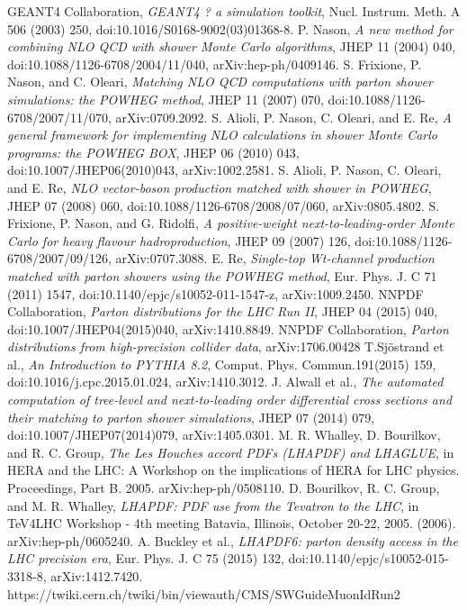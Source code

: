 \begin{thebibliography}{999}
		
		 GEANT4 Collaboration, \emph{GEANT4 ? a simulation toolkit}, Nucl. Instrum. Meth. A 506 (2003) 250, doi:10.1016/S0168-9002(03)01368-8.
		 P. Nason, \emph{A new method for combining NLO QCD with shower Monte Carlo algorithms}, JHEP 11 (2004) 040, doi:10.1088/1126-6708/2004/11/040, arXiv:hep-ph/0409146.
		 S. Frixione, P. Nason, and C. Oleari, \emph{Matching NLO QCD computations with parton shower simulations: the POWHEG method}, JHEP 11 (2007) 070, doi:10.1088/1126-6708/2007/11/070, arXiv:0709.2092.
		 S. Alioli, P. Nason, C. Oleari, and E. Re, \emph{A general framework for implementing NLO calculations in shower Monte Carlo programs: the POWHEG BOX}, JHEP 06 (2010) 043, doi:10.1007/JHEP06(2010)043, arXiv:1002.2581.
		 S. Alioli, P. Nason, C. Oleari, and E. Re, \emph{NLO vector-boson production matched with shower in POWHEG}, JHEP 07 (2008) 060, doi:10.1088/1126-6708/2008/07/060, arXiv:0805.4802.
		 S. Frixione, P. Nason, and G. Ridolfi, \emph{A positive-weight next-to-leading-order Monte Carlo for heavy flavour hadroproduction}, JHEP 09 (2007) 126, doi:10.1088/1126-6708/2007/09/126, arXiv:0707.3088.
		 E. Re, \emph{Single-top Wt-channel production matched with parton showers using the POWHEG method}, Eur. Phys. J. C 71 (2011) 1547, doi:10.1140/epjc/s10052-011-1547-z, arXiv:1009.2450.
		 NNPDF Collaboration, \emph{Parton distributions for the LHC Run II}, JHEP 04 (2015) 040, doi:10.1007/JHEP04(2015)040, arXiv:1410.8849. 
		 NNPDF Collaboration, \emph{Parton distributions from high-precision collider data}, arXiv:1706.00428
		 T.Sj\"ostrand et al., \emph{An Introduction to PYTHIA 8.2}, Comput. Phys. Commun.191(2015) 159, doi:10.1016/j.cpc.2015.01.024, arXiv:1410.3012.
		 J. Alwall et al., \emph{The automated computation of tree-level and next-to-leading order differential cross sections and their matching to parton shower simulations}, JHEP 07 (2014) 079, doi:10.1007/JHEP07(2014)079, arXiv:1405.0301.
		 M. R. Whalley, D. Bourilkov, and R. C. Group, \emph{The Les Houches accord PDFs (LHAPDF) and LHAGLUE}, in HERA and the LHC: A Workshop on the implications of HERA for LHC physics. Proceedings, Part B. 2005. arXiv:hep-ph/0508110.
		 D. Bourilkov, R. C. Group, and M. R. Whalley, \emph{LHAPDF: PDF use from the Tevatron to the LHC}, in TeV4LHC Workshop - 4th meeting Batavia, Illinois, October 20-22, 2005. (2006). arXiv:hep-ph/0605240.
		 A. Buckley et al., \emph{LHAPDF6: parton density access in the LHC precision era}, Eur. Phys. J. C 75 (2015) 132, doi:10.1140/epjc/s10052-015-3318-8, arXiv:1412.7420.
		 https://twiki.cern.ch/twiki/bin/viewauth/CMS/SWGuideMuonIdRun2



	 \end{thebibliography}
\clearpage{\pagestyle{empty}\cleardoublepage}